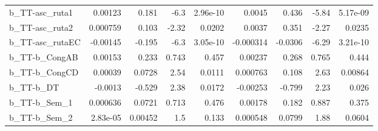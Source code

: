 \begin{tabular}{lrrrrrrrr}
b\_TT-asc\_ruta1       &     0.00123 &        0.181 &    -6.3 & 2.96e-10 &     0.0045 &       0.436 &        -5.84 &      5.17e-09 \\
b\_TT-asc\_ruta2       &    0.000759 &        0.103 &   -2.32 &   0.0202 &     0.0037 &       0.351 &        -2.27 &        0.0235 \\
b\_TT-asc\_rutaEC      &    -0.00145 &       -0.195 &    -6.3 & 3.05e-10 &  -0.000314 &     -0.0306 &        -6.29 &      3.21e-10 \\
b\_TT-b\_CongAB        &     0.00153 &        0.233 &   0.743 &    0.457 &    0.00237 &       0.268 &        0.765 &         0.444 \\
b\_TT-b\_CongCD        &     0.00039 &       0.0728 &    2.54 &   0.0111 &   0.000763 &       0.108 &         2.63 &       0.00864 \\
b\_TT-b\_DT            &     -0.0013 &       -0.529 &    2.38 &   0.0172 &   -0.00253 &      -0.799 &         2.23 &         0.026 \\
b\_TT-b\_Sem\_1         &    0.000636 &       0.0721 &   0.713 &    0.476 &    0.00178 &       0.182 &        0.887 &         0.375 \\
b\_TT-b\_Sem\_2         &    2.83e-05 &      0.00452 &     1.5 &    0.133 &   0.000548 &      0.0799 &         1.88 &        0.0604 \\
\bottomrule
\end{tabular}

